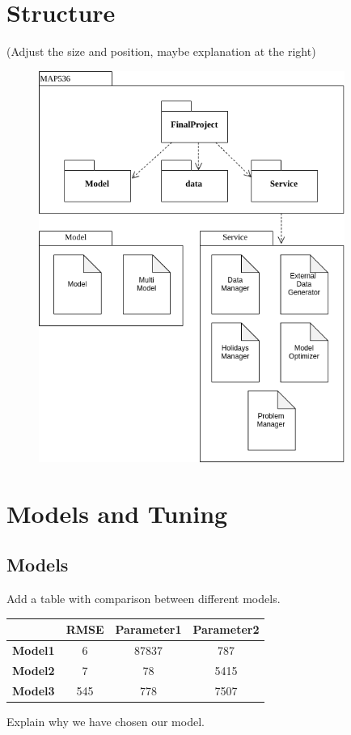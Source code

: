 \documentclass[a4paper,12pt,twoside]{article}
\begin{document}
\section{Structure}
(Adjust the size and position, maybe explanation at the right)
\begin{figure}[H]
	\includegraphics[width=100mm,scale=0.5]{UML.png}
\end{figure}

\section{Models and Tuning}
\subsection{Models}
Add a table with comparison between different models.
\begin{center}
	\begin{tabular}{||c || c c c||} 
		\hline
			 & RMSE & Parameter1 & Parameter2 \\ [0.5ex] 
		\hline\hline
		\textbf{Model1} & 6 & 87837 & 787 \\ 
		\hline
		\textbf{Model2} & 7 & 78 & 5415 \\
		\hline
		\textbf{Model3} & 545 & 778 & 7507 \\
		\hline
	\end{tabular}
\end{center}
Explain why we have chosen our model.
\end{document}
